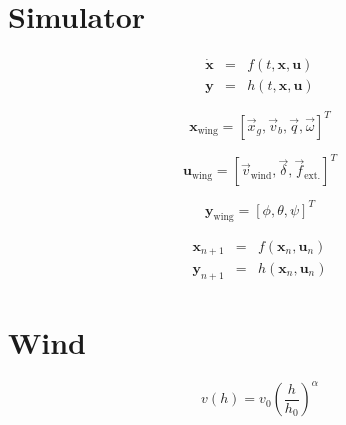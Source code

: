 \documentclass[11pt]{amsart}
\begin{document}
\section{Simulator}

\begin{eqnarray}
\dot{\mathbf{x}} &=& f(t, \mathbf{x}, \mathbf{u}) \\
\mathbf{y} &=& h(t, \mathbf{x}, \mathbf{u})
\end{eqnarray}

\begin{equation}
\mathbf{x}_{\mathrm{wing}} = [\vec{x}_g, \vec{v}_b, \vec{q}, \vec{\omega}]^T
\end{equation}

\begin{equation}
\mathbf{u}_{\mathrm{wing}} = [\vec{v}_{\mathrm{wind}}, \vec{\delta}, \vec{f}_{\mathrm{ext.}}]^T
\end{equation}

\begin{equation}
\mathbf{y}_{\mathrm{wing}} = [\phi, \theta, \psi]^T
\end{equation}

\begin{eqnarray}
\mathbf{x}_{n+1} &=& f(\mathbf{x}_n, \mathbf{u}_n) \\
\mathbf{y}_{n+1} &=& h(\mathbf{x}_n, \mathbf{u}_n)
\end{eqnarray}


\section{Wind}

\begin{equation}
v(h) = v_0 \left( \frac{h}{h_0} \right)^{\alpha}
\end{equation}
\end{document}
